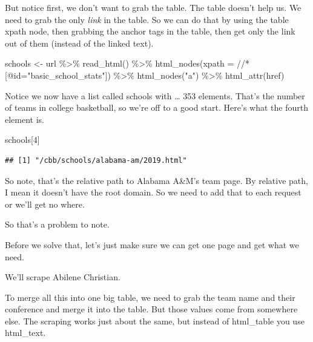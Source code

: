\documentclass[
]{book}
\newenvironment{Shaded}{\begin{snugshade}}{\end{snugshade}}
\newcommand{\AttributeTok}[1]{\textcolor[rgb]{0.77,0.63,0.00}{#1}}
\newcommand{\DecValTok}[1]{\textcolor[rgb]{0.00,0.00,0.81}{#1}}
\newcommand{\FunctionTok}[1]{\textcolor[rgb]{0.00,0.00,0.00}{#1}}
\newcommand{\NormalTok}[1]{#1}
\newcommand{\OtherTok}[1]{\textcolor[rgb]{0.56,0.35,0.01}{#1}}
\newcommand{\SpecialCharTok}[1]{\textcolor[rgb]{0.00,0.00,0.00}{#1}}
\newcommand{\StringTok}[1]{\textcolor[rgb]{0.31,0.60,0.02}{#1}}
\begin{document}
But notice first, we don't want to grab the table. The table doesn't help us. We need to grab the only \emph{link} in the table. So we can do that by using the table xpath node, then grabbing the anchor tags in the table, then get only the link out of them (instead of the linked text).

\begin{Shaded}
\begin{Highlighting}[]
\NormalTok{schools }\OtherTok{\textless{}{-}}\NormalTok{ url }\SpecialCharTok{\%\textgreater{}\%}
  \FunctionTok{read\_html}\NormalTok{() }\SpecialCharTok{\%\textgreater{}\%}
  \FunctionTok{html\_nodes}\NormalTok{(}\AttributeTok{xpath =} \StringTok{\textquotesingle{}//*[@id="basic\_school\_stats"]\textquotesingle{}}\NormalTok{) }\SpecialCharTok{\%\textgreater{}\%}
  \FunctionTok{html\_nodes}\NormalTok{(}\StringTok{"a"}\NormalTok{) }\SpecialCharTok{\%\textgreater{}\%}
  \FunctionTok{html\_attr}\NormalTok{(}\StringTok{\textquotesingle{}href\textquotesingle{}}\NormalTok{)}
\end{Highlighting}
\end{Shaded}

Notice we now have a list called schools with \ldots{} 353 elements. That's the number of teams in college basketball, so we're off to a good start. Here's what the fourth element is.

\begin{Shaded}
\begin{Highlighting}[]
\NormalTok{schools[}\DecValTok{4}\NormalTok{]}
\end{Highlighting}
\end{Shaded}

\begin{verbatim}
## [1] "/cbb/schools/alabama-am/2019.html"
\end{verbatim}

So note, that's the relative path to Alabama A\&M's team page. By relative path, I mean it doesn't have the root domain. So we need to add that to each request or we'll get no where.

So that's a problem to note.

Before we solve that, let's just make sure we can get one page and get what we need.

We'll scrape Abilene Christian.

To merge all this into one big table, we need to grab the team name and their conference and merge it into the table. But those values come from somewhere else. The scraping works just about the same, but instead of html\_table you use html\_text.
\end{document}
